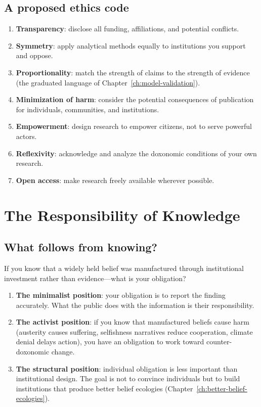 \subsection{A proposed ethics code}

\begin{model}
\label{mod:ethics-code}
\begin{enumerate}[nosep]
  \item \textbf{Transparency}: disclose all funding, affiliations, and potential conflicts.
  \item \textbf{Symmetry}: apply analytical methods equally to institutions you support and oppose.
  \item \textbf{Proportionality}: match the strength of claims to the strength of evidence (the graduated language of Chapter~\ref{ch:model-validation}).
  \item \textbf{Minimization of harm}: consider the potential consequences of publication for individuals, communities, and institutions.
  \item \textbf{Empowerment}: design research to empower citizens, not to serve powerful actors.
  \item \textbf{Reflexivity}: acknowledge and analyze the doxonomic conditions of your own research.
  \item \textbf{Open access}: make research freely available wherever possible.
\end{enumerate}
\end{model}

\section{The Responsibility of Knowledge}
\label{sec:ch34-responsibility}

\subsection{What follows from knowing?}

If you know that a widely held belief was manufactured through institutional investment rather than evidence---what is your obligation?

\begin{enumerate}
  \item \textbf{The minimalist position}: your obligation is to report the finding accurately.
  What the public does with the information is their responsibility.

  \item \textbf{The activist position}: if you know that manufactured beliefs cause harm (austerity causes suffering, selfishness narratives reduce cooperation, climate denial delays action), you have an obligation to work toward counter-doxonomic change.

  \item \textbf{The structural position}: individual obligation is less important than institutional design.
  The goal is not to convince individuals but to build institutions that produce better belief ecologies (Chapter~\ref{ch:better-belief-ecologies}).
\end{enumerate}

